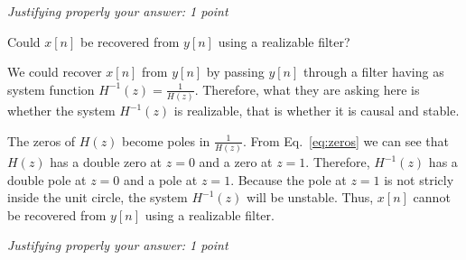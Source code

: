 \documentclass[a4paper,11pt,oneside]{article}
\begin{document}
\emph{Justifying properly your answer: 1 point}

Could $x[n]$ be recovered from $y[n]$ using a realizable filter?

We could recover $x[n]$ from $y[n]$ by passing $y[n]$ through a filter having as system function $H^{-1}(z)=\frac{1}{H(z)}$. Therefore, what they are asking here is whether the system $H^{-1}(z)$ is realizable, that is whether it is causal and stable. 

The zeros of $H(z)$ become poles in $\frac{1}{H(z)}$. From Eq.~\ref{eq:zeros} we can see that $H(z)$ has a double zero at $z=0$ and a zero at $z=1$. Therefore, $H^{-1}(z)$ has a double pole at $z=0$ and a pole at $z=1$. Because the pole at $z=1$ is not stricly inside the unit circle, the system $H^{-1}(z)$ will be unstable. Thus, $x[n]$ cannot be recovered from $y[n]$ using a realizable filter.

\emph{Justifying properly your answer: 1 point}
\end{document}
